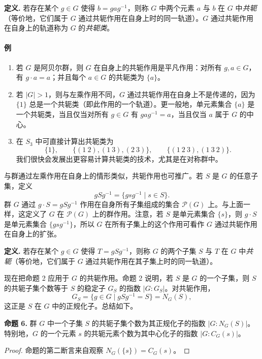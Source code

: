 \noindent\textbf{定义.} 若存在某个 $g\in G$ 使得 $b=gag^{-1}$，则称 $G$ 中两个元素 $a$ 与 $b$ 在 $G$ 中\emph{共轭}（等价地，它们属于 $G$ 通过共轭作用在自身上时的同一轨道）。$G$ 通过共轭作用在自身上的轨道称为 $G$ 的\emph{共轭类}。

\paragraph{例}
\begin{enumerate}[label=(\arabic*)]
  \item 若 $G$ 是阿贝尔群，则 $G$ 在自身上的共轭作用是平凡作用：对所有 $g,a\in G$，有 $g\cdot a=a$；并且每个 $a\in G$ 的共轭类为 $\{a\}$。
  \item 若 $|G|>1$，则与左乘作用不同，$G$ 通过共轭作用在自身上不是传递的，因为 $\{1\}$ 总是一个共轭类（即此作用的一个轨道）。更一般地，单元素集合 $\{a\}$ 是一个共轭类，当且仅当对所有 $g\in G$ 有 $gag^{-1}=a$，当且仅当 $a$ 属于 $G$ 的中心。
  \item 在 $S_3$ 中可直接计算出共轭类为
  \[
    \{1\},\qquad \{(1\ 2),(1\ 3),(2\ 3)\},\qquad \{(1\ 2\ 3),(1\ 3\ 2)\}.
  \]
  我们很快会发展出更容易计算共轭类的技术，尤其是在对称群中。
\end{enumerate}

与群通过左乘作用在自身上的情形类似，共轭作用也可推广。若 $S$ 是 $G$ 的任意子集，定义
\[
  gSg^{-1}=\{gsg^{-1}\mid s\in S\}.
\]
群 $G$ 通过 $g\cdot S=gSg^{-1}$ 作用在自身所有子集组成的集合 $\mathcal P(G)$ 上。与上面一样，这定义了 $G$ 在 $\mathcal P(G)$ 上的群作用。注意，若 $S$ 是单元素集合 $\{s\}$，则 $g\cdot S$ 是单元素集合 $\{gsg^{-1}\}$，所以 $G$ 在所有子集上的这个作用可看作 $G$ 通过共轭作用在自身上的扩张。

\noindent\textbf{定义.} 若存在某个 $g\in G$ 使得 $T=gSg^{-1}$，则称 $G$ 的两个子集 $S$ 与 $T$ 在 $G$ 中\emph{共轭}（等价地，它们属于 $G$ 通过共轭作用在其子集上时的同一轨道）。

现在把命题 2 应用于 $G$ 的共轭作用。命题 2 说明，若 $S$ 是 $G$ 的一个子集，则 $S$ 的共轭子集个数等于 $S$ 的稳定子 $G_S$ 的指数 $|G:G_S|$。对共轭作用，
\[
  G_S=\{g\in G\mid gSg^{-1}=S\}=N_G(S),
\]
这正是 $S$ 在 $G$ 中的正规化子。总结如下。

\medskip
\noindent\textbf{命题 6.} 群 $G$ 中一个子集 $S$ 的共轭子集个数为其正规化子的指数 $|G:N_G(S)|$。特别地，$G$ 的一个元素 $s$ 的共轭元素个数为其中心化子的指数 $|G:C_G(s)|$。

\begin{proof}
命题的第二断言来自观察 $N_G(\{s\})=C_G(s)$。
\end{proof}

